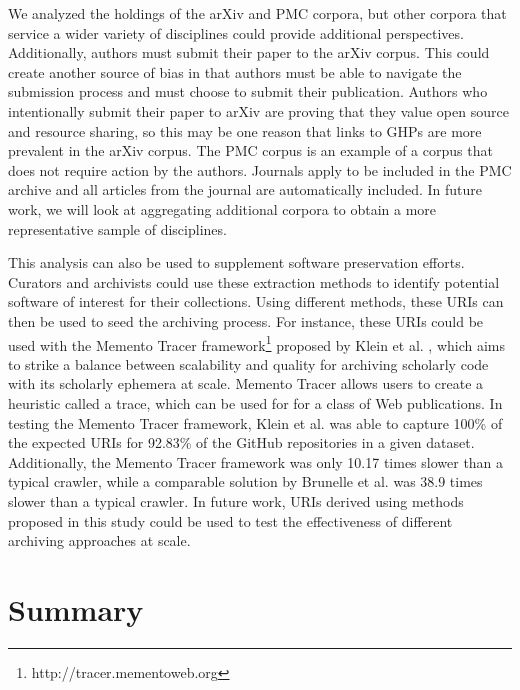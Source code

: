 We analyzed the holdings of the arXiv and PMC corpora, but other corpora that service a wider variety of disciplines could provide additional perspectives. Additionally, authors must submit their paper to the arXiv corpus. This could create another source of bias in that authors must be able to navigate the submission process and must choose to submit their publication. Authors who intentionally submit their paper to arXiv are proving that they value open source and resource sharing, so this may be one reason that links to GHPs are more prevalent in the arXiv corpus. The PMC corpus is an example of a corpus that does not require action by the authors. Journals apply to be included in the PMC archive and all articles from the journal are automatically included. In future work, we will look at aggregating additional corpora to obtain a more representative sample of disciplines.

This analysis can also be used to supplement software preservation efforts. Curators and archivists could use these extraction methods to identify potential software of interest for their collections. Using different methods, these URIs can then be used to seed the archiving process. For instance, these URIs could be used with the Memento Tracer framework\footnote{http://tracer.mementoweb.org} proposed by Klein et al. \cite{klein-dlok2019}, which aims to strike a balance between scalability and quality for archiving scholarly code with its scholarly ephemera at scale. Memento Tracer allows users to create a heuristic called a trace, which can be used for for a class of Web publications. In testing the Memento Tracer framework, Klein et al. \cite{klein-dlok2019} was able to capture 100\% of the expected URIs for 92.83\% of the GitHub repositories in a given dataset. Additionally, the Memento Tracer framework was only 10.17 times slower than a typical crawler, while a comparable solution by Brunelle et al. \cite{brunelle-jcdl2017} was 38.9 times slower than a typical crawler. In future work, URIs derived using methods proposed in this study could be used to test the effectiveness of different archiving approaches at scale.

\section{Summary}
